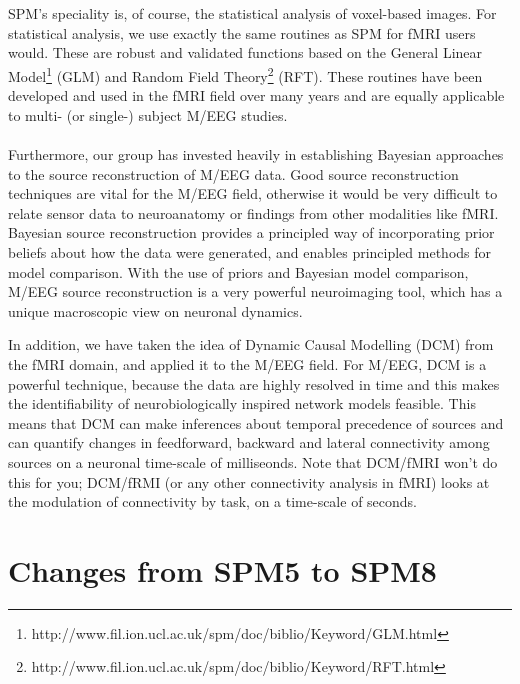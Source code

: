 \\
\\
SPM's speciality is, of course, the statistical analysis of voxel-based images. For statistical analysis, we use exactly the same routines as SPM for fMRI users would. These are robust and validated functions based on the General Linear Model\footnote{http://www.fil.ion.ucl.ac.uk/spm/doc/biblio/Keyword/GLM.html} (GLM) and Random Field Theory\footnote{http://www.fil.ion.ucl.ac.uk/spm/doc/biblio/Keyword/RFT.html} (RFT). These routines have been developed and used in the fMRI field over many years and are equally applicable to multi- (or single-) subject M/EEG studies.
\\
\\
Furthermore, our group has invested heavily in establishing Bayesian approaches to the source reconstruction of M/EEG data. Good source reconstruction techniques are vital for the M/EEG field, otherwise it would be very difficult to relate sensor data to neuroanatomy or findings from other modalities like fMRI. Bayesian source reconstruction provides a principled way of incorporating prior beliefs about how the data were generated, and enables principled methods for model comparison. With the use of priors and Bayesian model comparison, M/EEG source reconstruction is a very powerful neuroimaging tool, which has a unique macroscopic view on neuronal dynamics.

In addition, we have taken the idea of Dynamic Causal Modelling (DCM) from the fMRI domain, and applied it to the M/EEG field. For M/EEG, DCM is a powerful technique, because the data are highly resolved in time and this makes the identifiability of neurobiologically inspired network models feasible. This means that DCM can make inferences about temporal precedence of sources and can quantify changes in feedforward, backward and lateral connectivity among sources on a neuronal time-scale of milliseonds. Note that DCM/fMRI won't do this for you; DCM/fRMI (or any other connectivity analysis in fMRI) looks at the modulation of connectivity by task, on a time-scale of seconds.

\section{Changes from SPM5 to SPM8}

